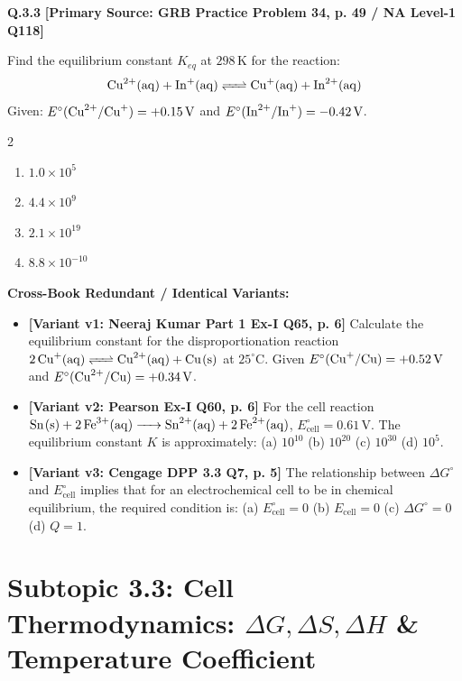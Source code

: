 \begin{problembox}
\textbf{Q.3.3} \hfill \textbf{[Primary Source: GRB Practice Problem 34, p. 49 / NA Level-1 Q118]}
\label{q:qb-c3-03}

Find the equilibrium constant $K_{eq}$ at $298\,\text{K}$ for the reaction:
\begin{equation*}
    \ce{Cu^2+(aq) + In+(aq) <=> Cu+(aq) + In^2+(aq)}
\end{equation*}
Given: $E^\circ(\ce{Cu^2+/Cu+}) = +0.15\,\text{V}$ and $E^\circ(\ce{In^2+/In+}) = -0.42\,\text{V}$.
\begin{multicols}{2}
\begin{enumerate}[label=(\alph*)]
    \item $1.0 \times 10^5$
    \item $4.4 \times 10^9$
    \item $2.1 \times 10^{19}$
    \item $8.8 \times 10^{-10}$
\end{enumerate}
\end{multicols}

\tcbline
\textbf{\color{accentamber}Cross-Book Redundant / Identical Variants:}
\begin{itemize}[leftmargin=*,itemsep=2pt]
    \item \textbf{[Variant v1: Neeraj Kumar Part 1 Ex-I Q65, p. 6]} Calculate the equilibrium constant for the disproportionation reaction $\ce{2Cu+(aq) <=> Cu^2+(aq) + Cu(s)}$ at $25^\circ\text{C}$. Given $E^\circ(\ce{Cu+/Cu}) = +0.52\,\text{V}$ and $E^\circ(\ce{Cu^2+/Cu}) = +0.34\,\text{V}$.
    \item \textbf{[Variant v2: Pearson Ex-I Q60, p. 6]} For the cell reaction $\ce{Sn(s) + 2Fe^3+(aq) -> Sn^2+(aq) + 2Fe^2+(aq)}$, $E^\circ_{\text{cell}} = 0.61\,\text{V}$. The equilibrium constant $K$ is approximately: (a) $10^{10}$ (b) $10^{20}$ (c) $10^{30}$ (d) $10^5$.
    \item \textbf{[Variant v3: Cengage DPP 3.3 Q7, p. 5]} The relationship between $\Delta G^\circ$ and $E^\circ_{\text{cell}}$ implies that for an electrochemical cell to be in chemical equilibrium, the required condition is: (a) $E^\circ_{\text{cell}} = 0$ (b) $E_{\text{cell}} = 0$ (c) $\Delta G^\circ = 0$ (d) $Q = 1$.
\end{itemize}
\end{problembox}

\section{Subtopic 3.3: Cell Thermodynamics: $\Delta G, \Delta S, \Delta H$ \& Temperature Coefficient}

